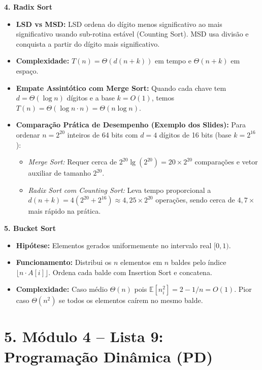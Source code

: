 \documentclass[11pt,a4paper]{article}
\newcommand{\topico}[1]{\par\medskip\textbf{\color{azul}#1}\par}
\newcommand{\secao}[1]{\section*{\color{azul}#1}}
\begin{document}
\topico{4. Radix Sort}
\begin{itemize}
  \item \textbf{LSD vs MSD:} LSD ordena do dígito menos significativo ao mais significativo usando sub-rotina estável (Counting Sort). MSD usa divisão e conquista a partir do dígito mais significativo.
  \item \textbf{Complexidade:} $T(n) = \Theta(d(n + k))$ em tempo e $\Theta(n + k)$ em espaço.
  \item \textbf{Empate Assintótico com Merge Sort:} Quando cada chave tem $d = \Theta(\log n)$ dígitos e a base $k = O(1)$, temos $T(n) = \Theta(\log n \cdot n) = \Theta(n \log n)$.
  \item \textbf{Comparação Prática de Desempenho (Exemplo dos Slides):} Para ordenar $n = 2^{20}$ inteiros de 64 bits com $d = 4$ dígitos de 16 bits (base $k = 2^{16}$):
  \begin{itemize}
    \item \textit{Merge Sort:} Requer cerca de $2^{20} \lg(2^{20}) = 20 \times 2^{20}$ comparações e vetor auxiliar de tamanho $2^{20}$.
    \item \textit{Radix Sort com Counting Sort:} Leva tempo proporcional a $d(n + k) = 4(2^{20} + 2^{16}) \approx 4{,}25 \times 2^{20}$ operações, sendo cerca de $4{,}7\times$ mais rápido na prática.
  \end{itemize}
\end{itemize}

\topico{5. Bucket Sort}
\begin{itemize}
  \item \textbf{Hipótese:} Elementos gerados uniformemente no intervalo real $[0, 1)$.
  \item \textbf{Funcionamento:} Distribui os $n$ elementos em $n$ baldes pelo índice $\lfloor n \cdot A[i] \rfloor$. Ordena cada balde com Insertion Sort e concatena.
  \item \textbf{Complexidade:} Caso médio $\Theta(n)$ pois $\mathbb{E}[n_i^2] = 2 - 1/n = O(1)$. Pior caso $\Theta(n^2)$ se todos os elementos caírem no mesmo balde.
\end{itemize}

\newpage
\secao{5. Módulo 4 -- Lista 9: Programação Dinâmica (PD)}
\end{document}
